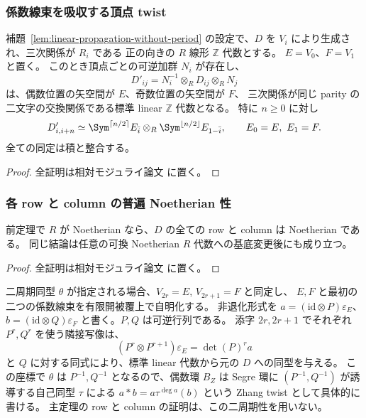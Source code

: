 \subsubsection{係数線束を吸収する頂点 twist}

\begin{theorem}[周期を用いない線型標準形]
\label{thm:linear-normalization-without-period}
補題~\ref{lem:linear-propagation-without-period} の設定で、$D$ を $V_i$ により生成され、三次関係が $R_i$ である
正の向きの $R$ 線形 $\mathbb Z$ 代数とする。
$E=V_0$、$F=V_1$ と置く。
このとき頂点ごとの可逆加群 $N_i$ が存在し、
\[
 D'_{ij}=N_i^{-1}\otimes_R D_{ij}\otimes_R N_j
\]
は、偶数位置の矢空間が $E$、奇数位置の矢空間が $F$、
三次関係が同じ parity の二文字の交換関係である標準 linear $\mathbb Z$ 代数となる。
特に $n\geq0$ に対し
\begin{equation}\label{eq:linear-symmetric-components}
 D'_{i,i+n}\simeq
 \Sym^{\lceil n/2\rceil}E_{\bar i}
       \otimes_R\Sym^{\lfloor n/2\rfloor}E_{1-\bar i},
 \qquad E_0=E,\ E_1=F.
\end{equation}
全ての同定は積と整合する。
\end{theorem}

\begin{proof}
全証明は相対モジュライ論文 \cite[\texttt{relative_cubic_noetherian}]{QuadricModuli2026} に置く。
\end{proof}

\subsubsection{各 row と column の普遍 Noetherian 性}

\begin{corollary}\label{cor:linear-universal-row-noetherian}
前定理で $R$ が Noetherian なら、$D$ の全ての row と column は Noetherian である。
同じ結論は任意の可換 Noetherian $R$ 代数への基底変更後にも成り立つ。
\end{corollary}

\begin{proof}
全証明は相対モジュライ論文 \cite[\texttt{relative_cubic_noetherian}]{QuadricModuli2026} に置く。
\end{proof}

\begin{remark}
二周期同型 $\theta$ が指定される場合、$V_{2r}=E$, $V_{2r+1}=F$ と同定し、
$E,F$ と最初の二つの係数線束を有限開被覆上で自明化する。
非退化形式を $a=(\mathrm{id}\otimes P)\varepsilon_E$、
$b=(\mathrm{id}\otimes Q)\varepsilon_F$ と書く。$P,Q$ は可逆行列である。
添字 $2r,2r+1$ でそれぞれ $P^r,Q^r$ を使う隣接写像は、
\[
 (P^r\otimes P^{r+1})\varepsilon_E=\det(P)^r a
\]
と $Q$ に対する同式により、標準 linear 代数から元の $D$ への同型を与える。
この座標で $\theta$ は $P^{-1},Q^{-1}$ となるので、偶数環 $B_Z$ は
Segre 環に $(P^{-1},Q^{-1})$ が誘導する自己同型 $\tau$ による
$a*b=a\tau^{\deg a}(b)$ という Zhang twist として具体的に書ける。
主定理の row と column の証明は、この二周期性を用いない。
\end{remark}

